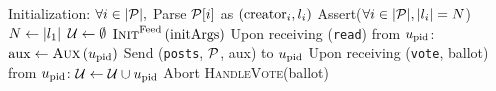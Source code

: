\begin{algorithm}[H]
  \caption{$\gfunc\left(\textsc{Init}^{\gfuncname}, \textsc{Aux},
  \textsc{HandleVote}\right)\left(\postlist, \mathrm{initArgs}\right)$}
  \label{alg:gfunc}
  \begin{algorithmic}[1]
    \State Initialization:
    \Indent
      \State $\forall i \in |\mathcal{P}|,$ Parse $\mathcal{P}[i]$ as
      $\left(\mathrm{creator}_i, l_i\right)$
      \State Assert($\forall i \in |\mathcal{P}|, |l_i| = N$)
      \State $N \gets |l_1|$
      \State $\mathcal{U} \gets \emptyset$
      \State $\textsc{Init}^{\mathrm{Feed}}\left(\mathrm{initArgs}\right)$
    \EndIndent
    \State
    \State Upon receiving (\texttt{read}) from $u_{\mathrm{pid}}$:
    \Indent
      \State $\mathrm{aux} \gets \textsc{Aux}\left(u_{\mathrm{pid}}\right)$
      \State Send (\texttt{posts}, $\mathcal{P}$, aux) to $u_{\mathrm{pid}}$
    \EndIndent
    \State
    \State Upon receiving (\texttt{vote}, ballot) from
    $u_{\mathrm{pid}}$:
     \Indent
       \State $\mathcal{U} \gets \mathcal{U} \cup u_{\mathrm{pid}}$
       \If{$|\playerlist| > \playerlen$}
         \State Abort
       \EndIf
       \State \textsc{HandleVote}(ballot)
     \EndIndent
  \end{algorithmic}
\end{algorithm}
